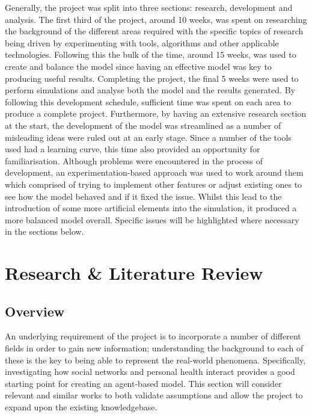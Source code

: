 \documentclass[]{report}
\begin{document}
Generally, the project was split into three sections: research, development and analysis. The first third of the project, around 10 weeks, was spent on researching the background of the different areas required with the specific topics of research being driven by experimenting with tools, algorithms and other applicable technologies. Following this the bulk of the time, around 15 weeks, was used to create and balance the model since having an effective model was key to producing useful results. Completing the project, the final 5 weeks were used to perform simulations and analyse both the model and the results generated. By following this development schedule, sufficient time was spent on each area to produce a complete project. Furthermore, by having an extensive research section at the start, the development of the model was streamlined as a number of misleading ideas were ruled out at an early stage. Since a number of the tools used had a learning curve, this time also provided an opportunity for familiarisation. Although problems were encountered in the process of development, an experimentation-based approach was used to work around them which comprised of trying to implement other features or adjust existing ones to see how the model behaved and if it fixed the issue. Whilst this lead to the introduction of some more artificial elements into the simulation, it produced a more balanced model overall. Specific issues will be highlighted where necessary in the sections below.


%
%

%
%
\chapter{Research \& Literature Review}
\label{sec:litrev}
\section{Overview}
An underlying requirement of the project is to incorporate a number of different fields in order to gain new information; understanding the background to each of these is the key to being able to represent the real-world phenomena. Specifically, investigating how social networks and personal health interact provides a good starting point for creating an agent-based model. This section will consider relevant and similar works to both validate assumptions and allow the project to expand upon the existing knowledgebase.
\end{document}
